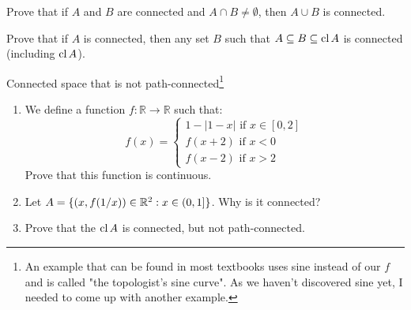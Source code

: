 \begin{exercise}
  Prove that if $A$ and $B$ are connected and $A\cap B\neq \emptyset$, then $A\cup B$ is connected.
\end{exercise}

\begin{exercise}
  Prove that if $A$ is connected, then any set $B$ such that $A\subseteq B\subseteq \text{cl\,} A$ is connected (including $\text{cl\,} A$).
\end{exercise}

\begin{exercise}
  Connected space that is not path-connected\footnote{An example that can be found in most textbooks uses sine instead of our $f$ and is called "the topologist’s sine curve". As we haven't discovered sine yet,
  I needed to come up with another example.}
  \begin{enumerate}
    \item We define a function $f: \mathbb R\to \mathbb R$ such that:
      $$f(x)=
        \begin{cases}
          1-|1-x| \text{ if } x\in [0,2]\\
          f(x+2) \text{ if } x < 0\\
          f(x-2) \text{ if } x > 2
        \end{cases}
      $$
      Prove that this function is continuous.
    \item Let $A=\{(x,f(1/x))\in \mathbb R^2 : x\in (0,1]\}$. Why is it connected?
    \item Prove that the $\text{cl\,} A$ is connected, but not path-connected.
  \end{enumerate}
\end{exercise}
